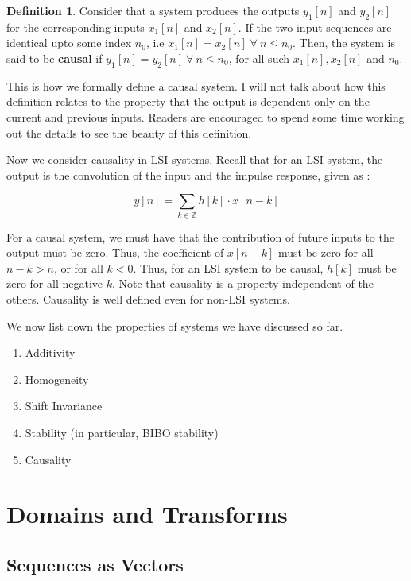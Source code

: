 \documentclass{article}
\theoremstyle{definition}
\newtheorem{defn}[theorem]{Definition}
\begin{document}
\begin{defn}
Consider that a system produces the outputs $y_1[n]$ and $y_2[n]$ for the corresponding inputs $x_1[n]$ and $x_2[n]$. If the two input sequences are identical upto some index $n_0$, i.e $x_1[n] = x_2[n]\: \forall \: n \leq n_0$. Then, the system is said to be \textbf{causal} if $y_1[n] = y_2[n] \: \forall \: n \leq n_0$, for all such $x_1[n] ,  x_2[n]$ and $n_0$.
\end{defn}

This is how we formally define a causal system. I will not talk about how this definition relates to the property that the output is dependent only on the current and previous inputs. Readers are encouraged to spend some time working out the details to see the beauty of this definition. \smallskip

Now we consider causality in LSI systems. Recall that for an LSI system, the output is the convolution of the input and the impulse response, given as :

\[
	y[n] = \sum_{k \in \mathbb{Z}} h[k]\cdot  x[n-k]
\]

For a causal system, we must have that the contribution of future inputs to the output must be zero. Thus, the coefficient of $x[n-k]$ must be zero for all $n-k > n$, or for all $k <0$. Thus, for an LSI system to be causal, $h[k]$ must be zero for all negative $k$. Note that causality is a property independent of the others. Causality is well defined even for non-LSI systems. 

\bigskip 

We now list down the properties of systems we have discussed so far. 
\begin{enumerate}
\item Additivity 
\item Homogeneity 
\item Shift Invariance 
\item Stability (in particular, BIBO stability)
\item Causality
\end{enumerate}
\clearpage

\section{Domains and Transforms}
\subsection{Sequences as Vectors}
\end{document}

